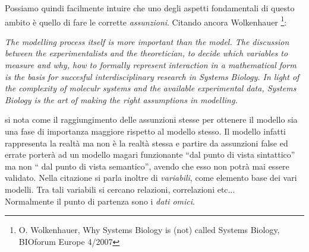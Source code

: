 \documentclass[a4paper,12pt, oneside]{book}
\begin{document}
Possiamo quindi facilmente intuire che uno degli aspetti fondamentali di questo
ambito è quello di fare le corrette \textit{assunzioni}. Citando ancora
Wolkenhauer \footnote{O. Wolkenhauer, Why Systems Biology is (not) called
  Systems Biology, BIOforum Europe 4/2007}:
\begin{center}
  \textit{The modelling process itself is more important than the model. The
    discussion between the experimentalists and the theoretician, to decide
    which variables to measure and why, how to formally represent interaction in
    a mathematical form is the basis for succesful interdisciplinary research in
    Systems Biology. In light of the complexity of moleculr systems and the
    available experimental data, Systems Biology is the art of making the right
    assumptions in modelling.}
\end{center}
si nota come il raggiungimento delle assunzioni stesse per ottenere il modello
sia una fase di importanza maggiore rispetto al modello stesso. Il modello
infatti rappresenta la realtà ma non è la realtà stessa e partire da assunzioni
false ed errate porterà ad un modello magari funzionante ``dal punto di vista
sintattico'' ma non `` dal punto di vista semantico'', avendo che esso non potrà
mai essere validato. Nella citazione si parla inoltre di \textit{variabili},
come elemento base dei vari modelli. Tra tali variabili si cercano relazioni,
correlazioni etc$\ldots$\\
Normalmente il punto di partenza sono i \textit{dati omici}.
\end{document}
